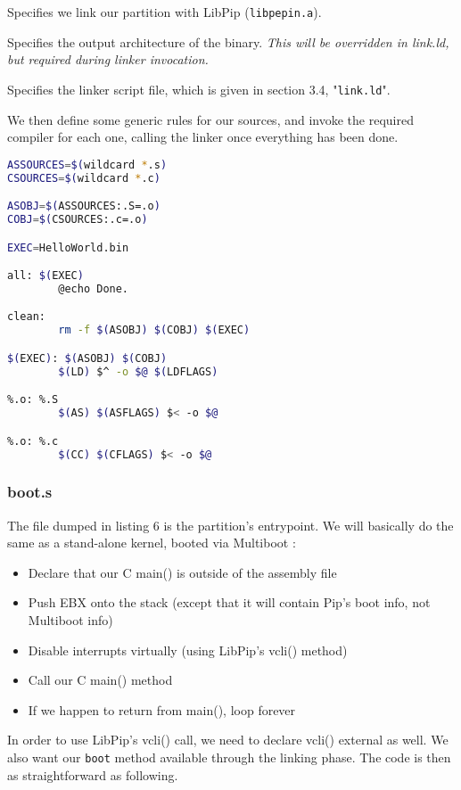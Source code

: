 \documentclass[10pt,a4paper,titlepage]{refart}
\begin{document}
Specifies we link our partition with LibPip (\texttt{libpepin.a}).

Specifies the output architecture of the binary. \textit{This will be overridden in link.ld, but required during linker invocation.}

Specifies the linker script file, which is given in section 3.4, "\texttt{link.ld}".

We then define some generic rules for our sources, and invoke the required compiler for each one, calling the linker once everything has been done.
\begin{lstlisting}[language=bash,caption={Makefile rules}]
ASSOURCES=$(wildcard *.s)
CSOURCES=$(wildcard *.c)

ASOBJ=$(ASSOURCES:.S=.o)
COBJ=$(CSOURCES:.c=.o)

EXEC=HelloWorld.bin

all: $(EXEC)
        @echo Done.

clean:
        rm -f $(ASOBJ) $(COBJ) $(EXEC)

$(EXEC): $(ASOBJ) $(COBJ)
        $(LD) $^ -o $@ $(LDFLAGS) 

%.o: %.S
        $(AS) $(ASFLAGS) $< -o $@

%.o: %.c
        $(CC) $(CFLAGS) $< -o $@
\end{lstlisting}

\subsubsection{boot.s}
The file dumped in listing 6 is the partition's entrypoint. We will basically do the same as a stand-alone kernel, booted via Multiboot :
\begin{itemize}
\item Declare that our C main() is outside of the assembly file
\item Push EBX onto the stack (except that it will contain Pip's boot info, not Multiboot info)
\item Disable interrupts virtually (using LibPip's vcli() method)
\item Call our C main() method
\item If we happen to return from main(), loop forever
\end{itemize}

In order to use LibPip's vcli() call, we need to declare vcli() external as well. We also want our \texttt{boot} method available through the linking phase.
The code is then as straightforward as following.
\end{document}
